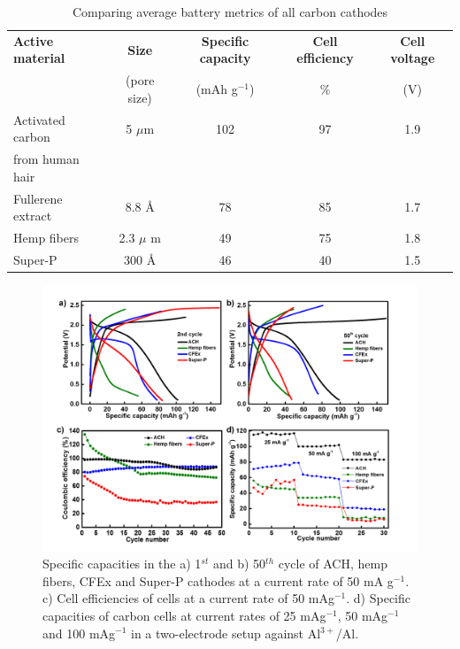 \begin{table}[t]
\caption{Comparing average battery metrics of all carbon cathodes} \label{table1}
\begin{center}
\begin{adjustbox}{width=\textwidth}
{\begin{tabular}{|lcccc|}
\hline
\textbf{Active material} & {\textbf{Size}} & \textbf{Specific capacity} & \textbf{Cell efficiency} & {\textbf{Cell voltage}}\\
 & (pore size) & (mAh g$^{-1}$) & $\%$ & (V)\\
\hline
Activated carbon & 5 ${\mu}$m & 102 & 97 & 1.9 \\
from human hair & & & & \\
Fullerene extract & 8.8 \AA & 78 & 85 & 1.7 \\
Hemp fibers & 2.3 $\mu$ m & 49 & 75 & 1.8 \\
Super-P & 300 \AA & 46 & 40 & 1.5 \\
\hline  %
\end{tabular}}
\end{adjustbox}
\end{center}
\end{table}

\begin{figure}[tbh!]
  \centering
  \includegraphics[width=\textwidth]{Figures/chap5fig/cdcall}
    \caption{Specific capacities in the a) 1$^{st}$ and b) 50$^{th}$ cycle of ACH, hemp fibers, CFEx and Super-P cathodes at a current rate of 50 mA g$^{-1}$. c) Cell efficiencies of cells at a current rate of 50 mAg$^{-1}$. d) Specific capacities of carbon cells at current rates of 25 mAg$^{-1}$, 50 mAg$^{-1}$ and 100 mAg$^{-1}$ in a two-electrode setup against Al$^{3+}$/Al. }
  \label{Figures/chap5fig:cdcall}
\end{figure}


